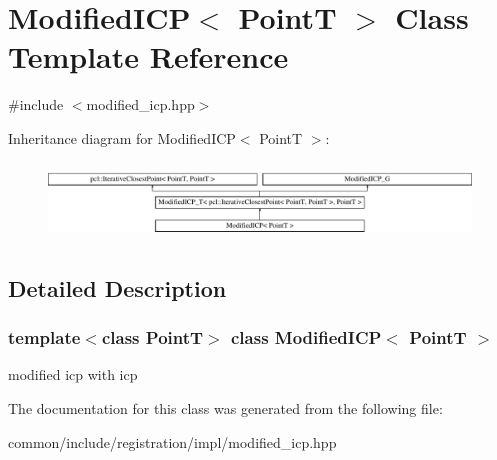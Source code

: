 \hypertarget{classModifiedICP}{
\section{ModifiedICP$<$ PointT $>$ Class Template Reference}
\label{classModifiedICP}
}


{\ttfamily \#include $<$modified\_\-icp.hpp$>$}

Inheritance diagram for ModifiedICP$<$ PointT $>$:\begin{figure}[H]
\begin{center}
\leavevmode
\includegraphics[height=2.043796cm]{classModifiedICP}
\end{center}
\end{figure}


\subsection{Detailed Description}
\subsubsection*{template$<$class PointT$>$ class ModifiedICP$<$ PointT $>$}

modified icp with icp 

The documentation for this class was generated from the following file:\begin{DoxyCompactItemize}
\item 
common/include/registration/impl/modified\_\-icp.hpp\end{DoxyCompactItemize}
